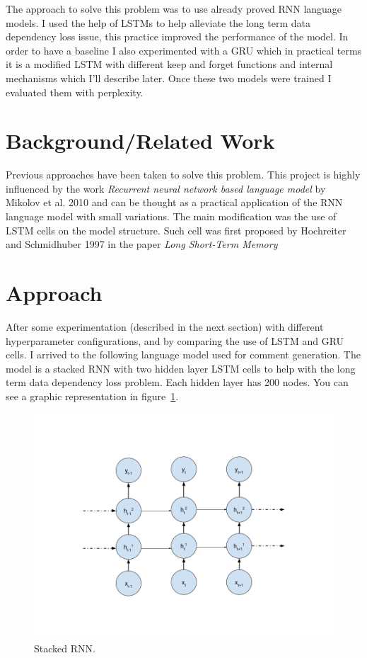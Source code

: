 \documentclass{article} %
\begin{document}
The approach to solve this problem was to use already proved RNN language
models. I used the help of LSTMs to help alleviate the long term data dependency
loss issue, this practice improved the performance of the model. In order to have
a baseline I also experimented with a GRU which in practical terms it is a
modified LSTM with different keep and forget functions and internal mechanisms
which I'll describe later. Once these two models were trained I evaluated them
with perplexity.

\section{Background/Related Work}
Previous approaches have been taken to solve this problem. This project is
highly influenced by the work \textit{Recurrent neural network based language
model} by Mikolov et al. 2010 and can be thought as a practical application of
the RNN language model with small variations. The main modification was the use
of LSTM cells on the model structure. Such cell was first proposed by Hochreiter
and Schmidhuber 1997 in the paper \textit{Long Short-Term Memory}

\section{Approach}
After some experimentation (described in the next section) with different
hyperparameter configurations, and by comparing the use of LSTM and GRU cells. I
arrived to the following language model used for comment generation. The model
is a stacked RNN with two hidden layer LSTM cells to help with the long term
data dependency loss problem. Each hidden layer has 200 nodes. You can see a
graphic representation in figure~\ref{fig:rnndiagram}.

\begin{figure}[h]
\centering
\includegraphics[scale=0.4]{rnn_diagram}
\caption{Stacked RNN.}
\label{fig:rnndiagram}
\end{figure}
\end{document}
